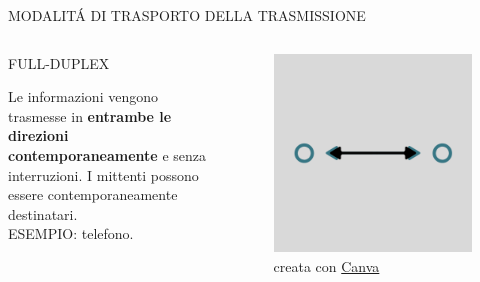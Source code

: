 \documentclass[aspectratio=1610,handout]{beamer}
\begin{document}
\begin{frame}{MODALIT\'A DI TRASPORTO DELLA TRASMISSIONE}
    \begin{columns}
        \begin{alertblock}{FULL-DUPLEX}
            \begin{minipage}{0.96\linewidth}
                \justifying
                Le informazioni vengono trasmesse in \textbf{entrambe le direzioni contemporaneamente} e senza interruzioni. 
                I mittenti possono essere contemporaneamente destinatari.\\
                ESEMPIO: telefono.
            \end{minipage}
        \end{alertblock}
           \begin{figure}
               \includegraphics[width=\linewidth]{img/fullduplex.png}
               \caption{{creata con \href{https://www.canva.com}{Canva}}}
           \end{figure}
    \end{columns}
\end{frame}
\end{document}
